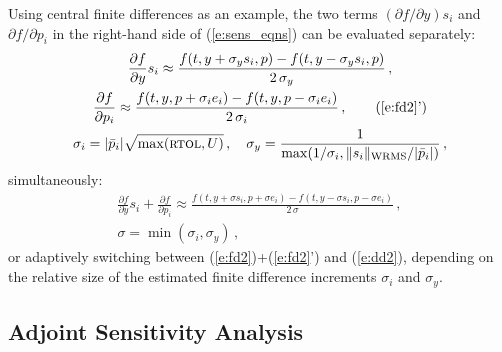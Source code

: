 Using central finite differences as an example, the two terms 
$({\partial f}/{\partial y}) s_i$ 
and ${\partial f}/{\partial p_i}$ in the right-hand side of (\ref{e:sens_eqns}) 
can be evaluated separately:
\begin{gather}
  \frac{\partial f}{\partial y} s_i \approx \frac{f(t, y+\sigma_y s_i, p)-
    f(t, y-\sigma_y s_i, p)}{2\,\sigma_y} \, , \label{e:fd2} \\
  \frac{\partial f}{\partial p_i} \approx \frac{f(t,y,p + \sigma_i e_i)-
    f(t,y,p - \sigma_i e_i)}{2\,\sigma_i} \, , \tag{\ref{e:fd2}'} \\
  \sigma_i = |{\bar p}_i| \sqrt{\max( \mbox{\sc rtol} , U)} \, , \quad
  \sigma_y = \frac{1}{\max(1/\sigma_i, \|s_i\|_{\mbox{\scriptsize WRMS}}/|{\bar p}_i|)} \, , \nonumber
\end{gather}
simultaneously:
\begin{gather}
  \frac{\partial f}{\partial y} s_i + \frac{\partial f}{\partial p_i} \approx
  \frac{f(t, y+\sigma s_i, p + \sigma e_i) -
    f(t, y-\sigma s_i, p - \sigma e_i)}{2\,\sigma} \, , \label{e:dd2} \\
  \sigma = \min(\sigma_i, \sigma_y) \, , \nonumber
\end{gather}
or adaptively switching between (\ref{e:fd2})+(\ref{e:fd2}') and (\ref{e:dd2}), 
depending on the relative size of the estimated finite difference 
increments $\sigma_i$ and $\sigma_y$.


\subsection{Adjoint Sensitivity Analysis}\label{ss:adj_sensitivity}

